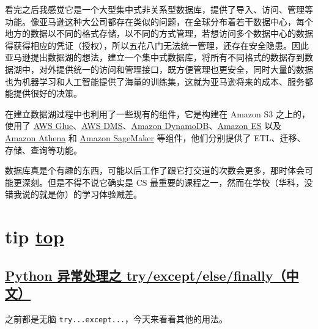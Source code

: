 看完之后我感觉它是一个大型集中式非关系型数据库，提供了导入、访问、管理等功能。像亚马逊这种大公司都存在类似的问题，在全球分布着若干数据中心，每个地方的数据以不同的格式存储，以不同的方式管理，若想访问多个数据中心的数据得获得相应的凭证（授权），所以五花八门无法统一管理，还存在安全隐患。因此亚马逊提出数据湖的想法，建立一个集中式数据库，将所有不同格式的数据存到数据湖中，对外提供统一的访问和管理接口，既方便管理也更安全，同时大量的数据也为机器学习和人工智能提供了海量的训练集，这就为亚马逊将来的成本、服务都能提供很好的决策。

在建立数据湖过程中也利用了一些现有的组件，它是构建在 Amazon S3 之上的，使用了 \href{https://aws.amazon.com/glue}{AWS Glue}、\href{https://aws.amazon.com/dms}{AWS DMS}、\href{https://aws.amazon.com/dynamodb/?nc2=h_ql_prod_db_ddb}{Amazon DynamoDB}、\href{https://aws.amazon.com/elasticsearch-service}{Amazon ES} 以及 \href{https://aws.amazon.com/athena}{Amazon Athena} 和 \href{https://aws.amazon.com/sagemaker}{Amazon SageMaker} 等组件，他们分别提供了 ETL、迁移、存储、查询等功能。

数据库真是个有趣的东西，可能以后工作了跟它打交道的次数会更多，那时体会可能更深刻。但是不得不说它确实是 CS 最重要的课程之一，然而在学校（华科，没错我说的就是你）的学习体验贼差。

\section{tip \hyperref[chap:w3]{top}}\label{w3:tip}

\subsection{\href{https://blog.csdn.net/m0_37822685/article/details/80259402}{Python 异常处理之 try/except/else/finally（中文）}}

之前都是无脑 \lstinline{try...except...}，今天来看看其他的用法。

